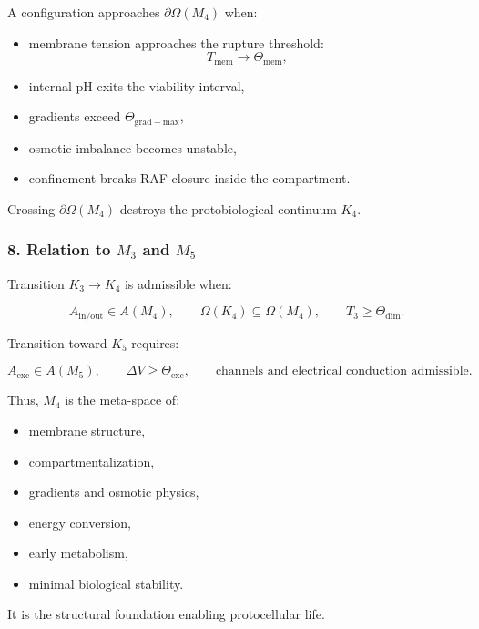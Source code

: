 A configuration approaches $\partial\Omega(M_4)$ when:

\begin{itemize}
    \item membrane tension approaches the rupture threshold:
    \[
    T_{\mathrm{mem}} \to \Theta_{\mathrm{mem}},
    \]
    \item internal pH exits the viability interval,
    \item gradients exceed $\Theta_{\mathrm{grad-max}}$,
    \item osmotic imbalance becomes unstable,
    \item confinement breaks RAF closure inside the compartment.
\end{itemize}

Crossing $\partial\Omega(M_4)$ destroys the protobiological continuum $K_4$.

\subsubsection*{8. Relation to \texorpdfstring{$M_3$}{M_3} and \texorpdfstring{$M_5$}{M_5}}

Transition $K_3 \to K_4$ is admissible when:

\[
A_{\mathrm{in/out}} \in A(M_4),
\qquad
\Omega(K_4) \subseteq \Omega(M_4),
\qquad
T_3 \ge \Theta_{\mathrm{dim}}.
\]

Transition toward $K_5$ requires:

\[
A_{\mathrm{exc}} \in A(M_5),
\qquad
\Delta V \ge \Theta_{\mathrm{exc}},
\qquad
\text{channels and electrical conduction admissible}.
\]

Thus, $M_4$ is the meta-space of:

\begin{itemize}
    \item membrane structure,
    \item compartmentalization,
    \item gradients and osmotic physics,
    \item energy conversion,
    \item early metabolism,
    \item minimal biological stability.
\end{itemize}

It is the structural foundation enabling protocellular life.
